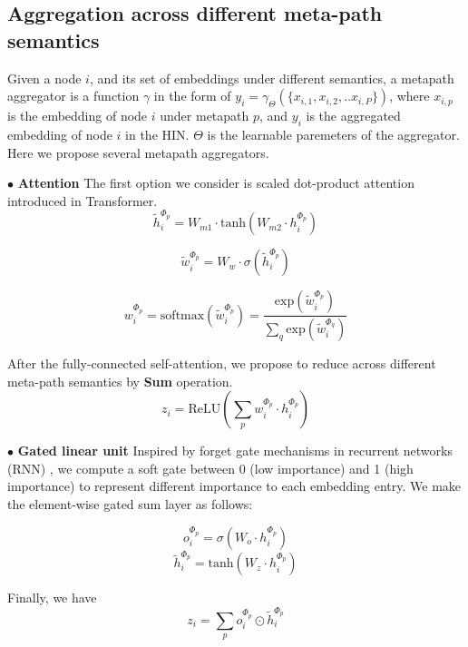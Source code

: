 \subsection{Aggregation across different meta-path semantics}
\label{sec:mp_aggr}
Given a node $i$, and its set of embeddings under different semantics, a metapath aggregator is a function $\gamma$ in the form of $y_i = \gamma_\Theta(\{x_{i,1},x_{i,2},..x_{i,P}\})$, where $x_{i,p}$ is the embedding of node $i$ under metapath $p$, and $y_i$ is the aggregated embedding of node $i$ in the HIN. $\Theta$ is the learnable paremeters of the aggregator.
Here we propose several metapath aggregators. 

$\bullet$ \textbf{Attention}
 The first option we consider is scaled dot-product attention introduced in Transformer. 
\begin{equation}
\label{eq:mp_mlp}
\tilde{h}^{\Phi_p}_i = W_{m1} \cdot \text{tanh}(W_{m2} \cdot h^{\Phi_p}_i)
\end{equation}

\begin{equation}
\label{eq:mp_attn}
\tilde{w}_i^{\Phi_p} = W_w \cdot \sigma(\tilde{h}^{\Phi_p}_i)
\end{equation}

\begin{equation}
\label{eq:mp_soft}
w_i^{\Phi_p} = \text{softmax}(\tilde{w}_i^{\Phi_p}) = \dfrac{\text{exp}(\tilde{w}_i^{\Phi_p})}{\sum_q \text{exp}(\tilde{w}_i^{\Phi_q})}
\end{equation}

After the fully-connected self-attention, we propose to reduce across different meta-path semantics by \textbf{Sum} operation.
\begin{equation}
\label{eq:mp_asum}
z_i = \text{ReLU}(\sum_p w_i^{\Phi_p} \cdot h^{\Phi_p}_i)
\end{equation}

$\bullet$ \textbf{Gated linear unit}
Inspired by forget gate mechanisms in recurrent networks (RNN) , we compute a soft gate between 0 (low importance) and 1 (high importance) to represent different importance to each embedding entry.
We make the element-wise gated sum layer as follows:
\begin{multicols}{2}
\begin{equation}
o^{\Phi_p}_i=\sigma(W_o \cdot h^{\Phi_p}_i)
\end{equation}\break
\begin{equation}
\tilde{h}^{\Phi_p}_i=\text{tanh}(W_z \cdot h^{\Phi_p}_i)
\end{equation}
\end{multicols}
Finally, we have
\begin{equation}
\label{eq:mp_sum}
{z}_i= \sum_p o^{\Phi_p}_i\odot \tilde{h}^{\Phi_p}_i
\end{equation}

